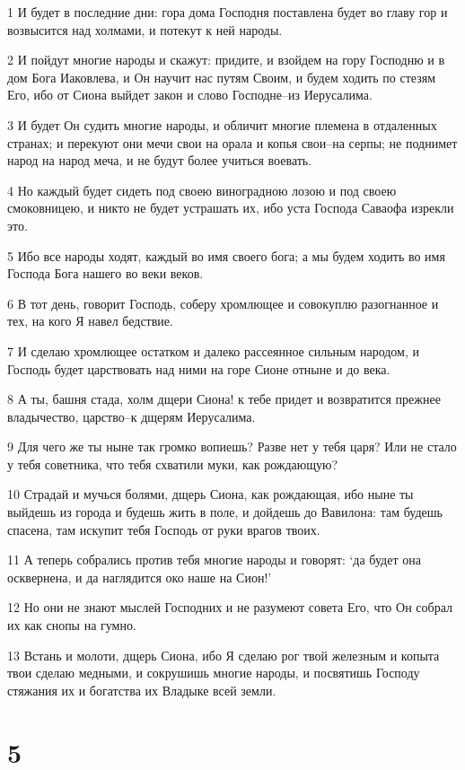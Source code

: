 \par 1 И будет в последние дни: гора дома Господня поставлена будет во главу гор и возвысится над холмами, и потекут к ней народы.
\par 2 И пойдут многие народы и скажут: придите, и взойдем на гору Господню и в дом Бога Иаковлева, и Он научит нас путям Своим, и будем ходить по стезям Его, ибо от Сиона выйдет закон и слово Господне--из Иерусалима.
\par 3 И будет Он судить многие народы, и обличит многие племена в отдаленных странах; и перекуют они мечи свои на орала и копья свои--на серпы; не поднимет народ на народ меча, и не будут более учиться воевать.
\par 4 Но каждый будет сидеть под своею виноградною лозою и под своею смоковницею, и никто не будет устрашать их, ибо уста Господа Саваофа изрекли это.
\par 5 Ибо все народы ходят, каждый во имя своего бога; а мы будем ходить во имя Господа Бога нашего во веки веков.
\par 6 В тот день, говорит Господь, соберу хромлющее и совокуплю разогнанное и тех, на кого Я навел бедствие.
\par 7 И сделаю хромлющее остатком и далеко рассеянное сильным народом, и Господь будет царствовать над ними на горе Сионе отныне и до века.
\par 8 А ты, башня стада, холм дщери Сиона! к тебе придет и возвратится прежнее владычество, царство--к дщерям Иерусалима.
\par 9 Для чего же ты ныне так громко вопиешь? Разве нет у тебя царя? Или не стало у тебя советника, что тебя схватили муки, как рождающую?
\par 10 Страдай и мучься болями, дщерь Сиона, как рождающая, ибо ныне ты выйдешь из города и будешь жить в поле, и дойдешь до Вавилона: там будешь спасена, там искупит тебя Господь от руки врагов твоих.
\par 11 А теперь собрались против тебя многие народы и говорят: `да будет она осквернена, и да наглядится око наше на Сион!'
\par 12 Но они не знают мыслей Господних и не разумеют совета Его, что Он собрал их как снопы на гумно.
\par 13 Встань и молоти, дщерь Сиона, ибо Я сделаю рог твой железным и копыта твои сделаю медными, и сокрушишь многие народы, и посвятишь Господу стяжания их и богатства их Владыке всей земли.

\chapter{5}

